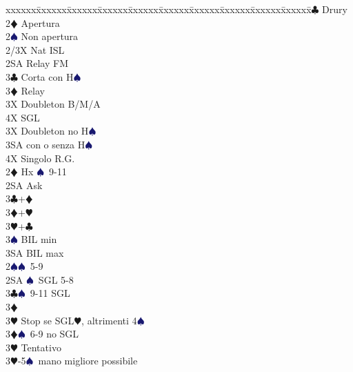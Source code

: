 \documentclass[a4paper,italian]{article}
\newcommand{\BC}{\textcolor{OliveGreen}{$\clubsuit$}}
\newcommand{\BD}{\textcolor{RedOrange}{$\vardiamondsuit$}}
\newcommand{\BH}{\textcolor{Red2}{$\varheartsuit${}}}
\newcommand{\BS}{\textcolor{MidnightBlue}{$\spadesuit${}}}
\newenvironment{bidtable}
{\begin{tabbing}

    xxxxxx\=xxxxxx\=xxxxxx\=xxxxxx\=xxxxxx\=xxxxxx\=xxxxxx\=xxxxxx\=xxxxxx\=xxxxxx\=\kill}
{\end{tabbing} }%
\begin{document}
\begin{multicols}{2}
                                        \begin{bidtable}
                                            2\BC \> Drury\+\\
                                            2\BD \> Apertura\\
                                            2\BS \> Non apertura\\
                                            2/3X \> Nat ISL\\
                                            2SA \> Relay FM\+\\
                                            3\BC \> Corta con H\BS \+\\
                                            3\BD \> Relay\+\\
                                            3X \> Doubleton B/M/A\\
                                            4X \> SGL\-\-\\
                                            3X \> Doubleton no H\BS \\
                                            3SA  con o senza H\BS \\
                                            4X \> Singolo R.G.\-\-\\
                                            2\BD \> Hx \BS\ 9-11\+\\
                                            2SA \> Ask \+\\
                                            3\BC {}+\BD\\
                                            3\BD {}+\BH\\
                                            3\BH {}+\BC\\
                                            3\BS \> BIL min\\
                                            3SA \> BIL max\-\-\\
                                            2\BS {}\BS\ 5-9\\
                                            2SA \BS\ SGL 5-8\\
                                            3\BC {}\BS\ 9-11 SGL\+\\
                                            3\BD \> \textregistered\\
                                            3\BH \> Stop se SGL\BH, altrimenti 4\BS\-\\
                                            3\BD {}\BS\ 6-9 no SGL\+\\
                                            3\BH \> Tentativo \-\\
                                            3\BH {}-5\BS\, mano migliore possibile
                                        \end{bidtable}
                                    \end{multicols}
                                    \newpage
\end{document}
